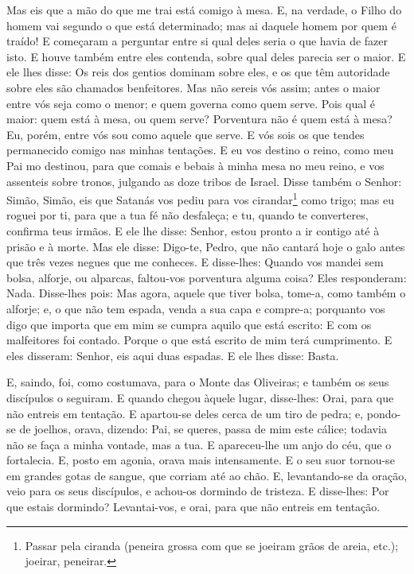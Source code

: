 Mas eis que a mão do que me trai está comigo à mesa. E, na
verdade, o Filho do homem vai segundo o que está determinado; mas ai
daquele homem por quem é traído! E começaram a perguntar
entre si qual deles seria o que havia de fazer isto. E houve
também entre eles contenda, sobre qual deles parecia ser o maior.
E ele lhes disse: Os reis dos gentios dominam sobre eles, e
os que têm autoridade sobre eles são chamados benfeitores.
Mas não sereis vós assim; antes o maior entre vós seja como o
menor; e quem governa como quem serve. Pois qual é maior:
quem está à mesa, ou quem serve? Porventura não é quem está à mesa?
Eu, porém, entre vós sou como aquele que serve. E vós sois os
que tendes permanecido comigo nas minhas tentações. E eu vos
destino o reino, como meu Pai mo destinou, para que comais e
bebais à minha mesa no meu reino, e vos assenteis sobre tronos,
julgando as doze tribos de Israel. Disse também o Senhor:
Simão, Simão, eis que Satanás vos pediu para vos
cirandar\footnote{Passar pela ciranda (peneira grossa com que se
joeiram grãos de areia, etc.); joeirar, peneirar.} como trigo;
mas eu roguei por ti, para que a tua fé não desfaleça; e tu,
quando te converteres, confirma teus irmãos. E ele lhe disse:
Senhor, estou pronto a ir contigo até à prisão e à morte. Mas
ele disse: Digo-te, Pedro, que não cantará hoje o galo antes que
três vezes negues que me conheces. E disse-lhes: Quando vos
mandei sem bolsa, alforje, ou alparcas, faltou-vos porventura alguma
coisa? Eles responderam: Nada. Disse-lhes pois: Mas agora,
aquele que tiver bolsa, tome-a, como também o alforje; e, o que não
tem espada, venda a sua capa e compre-a; porquanto vos digo
que importa que em mim se cumpra aquilo que está escrito: E com os
malfeitores foi contado. Porque o que está escrito de mim terá
cumprimento. E eles disseram: Senhor, eis aqui duas espadas.
E ele lhes disse: Basta.

E, saindo, foi, como costumava, para o Monte das Oliveiras; e
também os seus discípulos o seguiram. E quando chegou àquele
lugar, disse-lhes: Orai, para que não entreis em tentação. E
apartou-se deles cerca de um tiro de pedra; e, pondo-se de joelhos,
orava, dizendo: Pai, se queres, passa de mim este cálice;
todavia não se faça a minha vontade, mas a tua. E
apareceu-lhe um anjo do céu, que o fortalecia. E, posto em
agonia, orava mais intensamente. E o seu suor tornou-se em grandes
gotas de sangue, que corriam até ao chão. E, levantando-se da
oração, veio para os seus discípulos, e achou-os dormindo de
tristeza. E disse-lhes: Por que estais dormindo?
Levantai-vos, e orai, para que não entreis em tentação.

